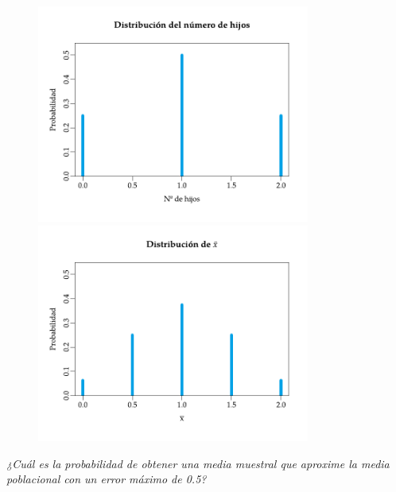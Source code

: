 \documentclass[
  a4paper,
]{scrreport}
\theoremstyle{plain}
\theoremstyle{definition}
\theoremstyle{definition}
\theoremstyle{remark}
\begin{document}
\begin{figure}

\begin{minipage}{0.50\linewidth}
\begin{center}
\includegraphics[width=0.8\textwidth,height=\textheight]{img/estimacion/diagrama-barras-distribucion-poblacion.pdf}
\end{center}
\end{minipage}%
%
\begin{minipage}{0.50\linewidth}
\begin{center}
\includegraphics[width=0.8\textwidth,height=\textheight]{img/estimacion/diagrama-barras-distribucion-media.pdf}
\end{center}
\end{minipage}%

\end{figure}%

\emph{¿Cuál es la probabilidad de obtener una media muestral que
aproxime la media poblacional con un error máximo de 0.5?}
\end{document}
